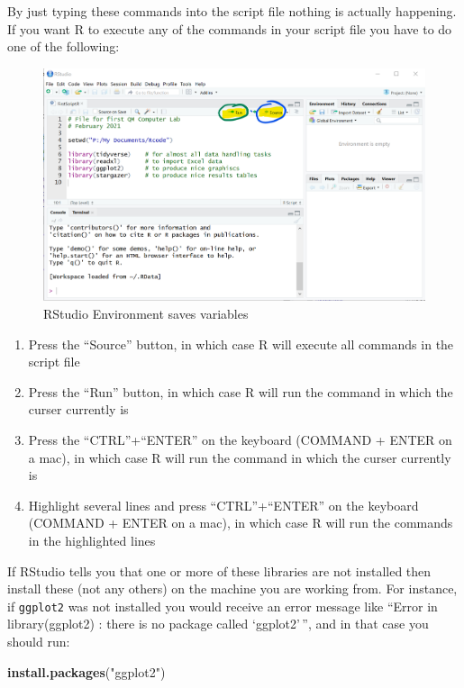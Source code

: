 \documentclass[
]{article}
\newenvironment{Shaded}{\begin{snugshade}}{\end{snugshade}}
\newcommand{\FunctionTok}[1]{\textcolor[rgb]{0.13,0.29,0.53}{\textbf{#1}}}
\newcommand{\NormalTok}[1]{#1}
\newcommand{\StringTok}[1]{\textcolor[rgb]{0.31,0.60,0.02}{#1}}
\providecommand{\tightlist}{%
  \setlength{\itemsep}{0pt}\setlength{\parskip}{0pt}}
\begin{document}
By just typing these commands into the script file nothing is actually
happening. If you want R to execute any of the commands in your script
file you have to do one of the following:

\begin{figure}
\centering
\includegraphics{images/RStudio_Image1.png}
\caption{RStudio Environment saves variables}
\end{figure}

\begin{enumerate}
\def\labelenumi{\arabic{enumi}.}
\tightlist
\item
  Press the ``Source'' button, in which case R will execute all commands
  in the script file
\item
  Press the ``Run'' button, in which case R will run the command in
  which the curser currently is
\item
  Press the ``CTRL''+``ENTER'' on the keyboard (COMMAND + ENTER on a
  mac), in which case R will run the command in which the curser
  currently is
\item
  Highlight several lines and press ``CTRL''+``ENTER'' on the keyboard
  (COMMAND + ENTER on a mac), in which case R will run the commands in
  the highlighted lines
\end{enumerate}

If RStudio tells you that one or more of these libraries are not
installed then install these (not any others) on the machine you are
working from. For instance, if \texttt{ggplot2} was not installed you
would receive an error message like ``Error in library(ggplot2) : there
is no package called `ggplot2'\,'', and in that case you should run:

\begin{Shaded}
\begin{Highlighting}[]
\FunctionTok{install.packages}\NormalTok{(}\StringTok{"ggplot2"}\NormalTok{)}
\end{Highlighting}
\end{Shaded}
\end{document}
